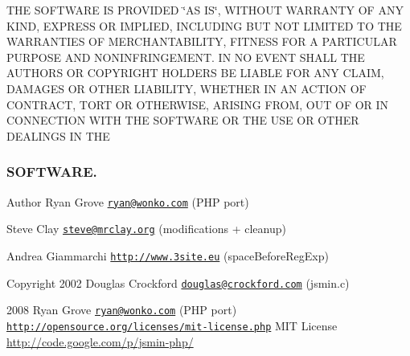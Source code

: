 T\+HE S\+O\+F\+T\+W\+A\+RE IS P\+R\+O\+V\+I\+D\+ED \char`\"{}\+A\+S I\+S\char`\"{}, W\+I\+T\+H\+O\+UT W\+A\+R\+R\+A\+N\+TY OF A\+NY K\+I\+ND, E\+X\+P\+R\+E\+SS OR I\+M\+P\+L\+I\+ED, I\+N\+C\+L\+U\+D\+I\+NG B\+UT N\+OT L\+I\+M\+I\+T\+ED TO T\+HE W\+A\+R\+R\+A\+N\+T\+I\+ES OF M\+E\+R\+C\+H\+A\+N\+T\+A\+B\+I\+L\+I\+TY, F\+I\+T\+N\+E\+SS F\+OR A P\+A\+R\+T\+I\+C\+U\+L\+AR P\+U\+R\+P\+O\+SE A\+ND N\+O\+N\+I\+N\+F\+R\+I\+N\+G\+E\+M\+E\+NT. IN NO E\+V\+E\+NT S\+H\+A\+LL T\+HE A\+U\+T\+H\+O\+RS OR C\+O\+P\+Y\+R\+I\+G\+HT H\+O\+L\+D\+E\+RS BE L\+I\+A\+B\+LE F\+OR A\+NY C\+L\+A\+IM, D\+A\+M\+A\+G\+ES OR O\+T\+H\+ER L\+I\+A\+B\+I\+L\+I\+TY, W\+H\+E\+T\+H\+ER IN AN A\+C\+T\+I\+ON OF C\+O\+N\+T\+R\+A\+CT, T\+O\+RT OR O\+T\+H\+E\+R\+W\+I\+SE, A\+R\+I\+S\+I\+NG F\+R\+OM, O\+UT OF OR IN C\+O\+N\+N\+E\+C\+T\+I\+ON W\+I\+TH T\+HE S\+O\+F\+T\+W\+A\+RE OR T\+HE U\+SE OR O\+T\+H\+ER D\+E\+A\+L\+I\+N\+GS IN T\+HE \subsubsection*{S\+O\+F\+T\+W\+A\+RE. }

\begin{DoxyAuthor}{Author}
Ryan Grove \href{mailto:ryan@wonko.com}{\tt ryan@wonko.\+com} (P\+HP port) 

Steve Clay \href{mailto:steve@mrclay.org}{\tt steve@mrclay.\+org} (modifications + cleanup) 

Andrea Giammarchi \href{http://www.3site.eu}{\tt http\+://www.\+3site.\+eu} (space\+Before\+Reg\+Exp) 
\end{DoxyAuthor}
\begin{DoxyCopyright}{Copyright}
2002 Douglas Crockford \href{mailto:douglas@crockford.com}{\tt douglas@crockford.\+com} (jsmin.\+c) 

2008 Ryan Grove \href{mailto:ryan@wonko.com}{\tt ryan@wonko.\+com} (P\+HP port)  \href{http://opensource.org/licenses/mit-license.php}{\tt http\+://opensource.\+org/licenses/mit-\/license.\+php} M\+IT License \hyperlink{}{http\+://code.\+google.\+com/p/jsmin-\/php/}
\end{DoxyCopyright}
